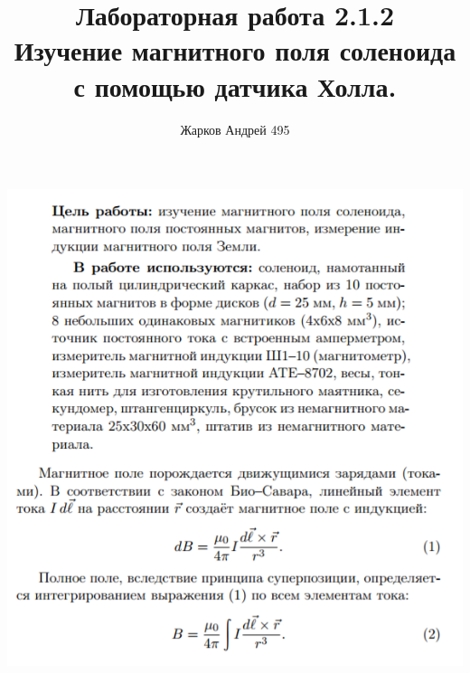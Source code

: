 \documentclass[12pt]{article}
\begin{document}
	\author {Жарков Андрей 495}
	\title {Лабораторная работа 2.1.2 \\  Изучение магнитного поля соленоида с помощью датчика Холла.}
    \maketitle{}
	    
    \begin{center}
       	\includegraphics[width=15cm]{theory1.png}

\end{center}
\end{document}
